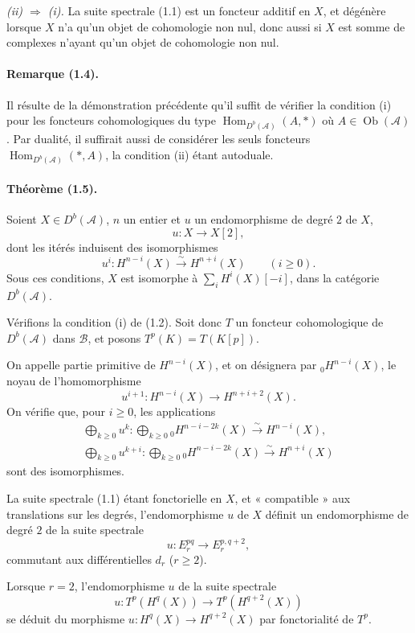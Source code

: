 \documentclass[10pt]{article}
\newcommand{\Acal}{\mathcal A}
\newcommand{\Bcal}{\mathcal B}
\newcommand{\Db}{D^b}
\newcommand{\Hom}{\operatorname{Hom}}
\newcommand{\iso}{\xrightarrow{\sim}}
\begin{document}
\emph{(ii) $\Rightarrow$ (i).} La suite spectrale (1.1) est un foncteur additif en $X$, et dégénère lorsque $X$ n'a qu'un objet de cohomologie non nul, donc aussi si $X$ est somme de complexes n'ayant qu'un objet de cohomologie non nul.

\paragraph{Remarque (1.4).} Il résulte de la démonstration précédente qu'il suffit de vérifier la condition (i) pour les foncteurs cohomologiques du type $\Hom_{\Db(\Acal)}(A,*)$ où $A\in\operatorname{Ob}(\Acal)$. Par dualité, il suffirait aussi de considérer les seuls foncteurs $\Hom_{\Db(\Acal)}(*,A)$, la condition (ii) étant autoduale.

\paragraph{Théorème (1.5).} Soient $X\in\Db(\Acal)$, $n$ un entier et $u$ un endomorphisme de degré $2$ de $X$,
\[
u:X\longrightarrow X[2],
\]
dont les itérés induisent des isomorphismes
\[
u^i:H^{n-i}(X)\iso H^{n+i}(X)\qquad(i\ge0).
\]
Sous ces conditions, $X$ est isomorphe à $\sum_i H^i(X)[-i]$, dans la catégorie $\Db(\Acal)$.

Vérifions la condition (i) de (1.2). Soit donc $T$ un foncteur cohomologique de $\Db(\Acal)$ dans $\Bcal$, et posons $T^p(K)=T(K[p])$.

On appelle partie primitive de $H^{n-i}(X)$, et on désignera par ${}_0H^{n-i}(X)$, le noyau de l'homomorphisme
\[
u^{i+1}:H^{n-i}(X)\longrightarrow H^{n+i+2}(X).
\]
On vérifie que, pour $i\ge0$, les applications
\[
\tag{1.6}
\begin{gathered}
\bigoplus_{k\ge0} u^k:\bigoplus_{k\ge0}{}_0H^{n-i-2k}(X)\iso H^{n-i}(X),\\
\bigoplus_{k\ge0}u^{k+i}:\bigoplus_{k\ge0}{}_0H^{n-i-2k}(X)\iso H^{n+i}(X)
\end{gathered}
\]
sont des isomorphismes.

La suite spectrale (1.1) étant fonctorielle en $X$, et « compatible » aux translations sur les degrés, l'endomorphisme $u$ de $X$ définit un endomorphisme de degré $2$ de la suite spectrale
\[
u:E_r^{pq}\longrightarrow E_r^{p,q+2},
\]
commutant aux différentielles $d_r$ ($r\ge2$).

Lorsque $r=2$, l'endomorphisme $u$ de la suite spectrale
\[
u:T^p(H^q(X))\longrightarrow T^p(H^{q+2}(X))
\]
se déduit du morphisme $u:H^q(X)\to H^{q+2}(X)$ par fonctorialité de $T^p$.
\end{document}
